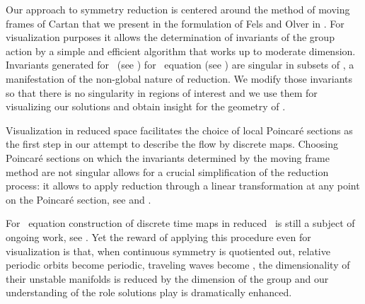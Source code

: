 Our approach to symmetry reduction is centered around the method of moving frames of Cartan 
that we present in the formulation of Fels and Olver  in . For visualization
purposes it allows the determination of invariants of the group action by a simple
and efficient algorithm that works up to moderate dimension.
Invariants generated for \CLe\ (see ) for \KS\ equation
(see ) are singular in subsets of \statesp, a manifestation of the non-global
nature of reduction. We modify those invariants so that there is
no singularity in regions of interest and we use them for visualizing our solutions and obtain insight
for the geometry of \statesp.

Visualization in reduced space facilitates the choice of local Poincar\'e sections as the first step in
our attempt to describe the flow by discrete maps. Choosing Poincar\'e sections on which the invariants
determined by the moving frame method are not singular allows for a crucial simplification of the reduction
process: it allows to apply reduction through a linear transformation at any point on the Poincar\'e section,
see  and
.

For \KS\ equation construction of discrete time maps in reduced \statesp\ is still a subject of ongoing
work, see . Yet the reward of applying this procedure even for visualization
is that, when continuous symmetry is quotiented out, relative periodic
orbits become periodic, traveling waves become \eqva, the dimensionality of their unstable manifolds
is reduced by the dimension of the group and our understanding of the role solutions play is dramatically
enhanced.
